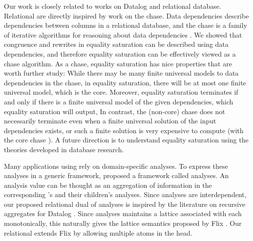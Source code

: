 Our work is closely related to works on Datalog and relational database.
Relational \egraphs are directly inspired by work on the chase.
Data dependencies describe dependencies between columns in a relational database, 
 and the chase is a family of iterative algorithms
 for reasoning about data dependencies \citep{chase-revisited, bench-chase}.
We showed that congruence and rewrites in equality saturation 
 can be described using data dependencies, 
 and therefore equality saturation can be effectively viewed as a chase algorithm.
As a chase, equality saturation has nice properties that are worth further study:
While there may be many finite universal models to data dependencies in the chase,
 in equality saturation,
 there will be at most one finite universal model, 
 which is the core.
Moreover,
 equality saturation terminates 
 if and only if there is a finite universal model of the given dependencies, 
 which equality saturation will output,
In contrast,
 the (non-core) chase does not necessarily terminate 
 even when a finite universal solution of the input dependencies exists,
 or such a finite solution is very expensive to compute (with the core chase \citep{chase-revisited}).
A future direction is 
 to understand equality saturation using the theories developed 
 in database research.

Many applications using \egraphs rely on domain-specific analyses.
To express these analyses in a generic \egraph framework, 
 \egg proposed a framework called \eclass analyses.
An \eclass analysis value can be thought as an aggregation of 
 information in the corresponding \eclass's \enodes and their children's \eclass analyses.
Since \eclass analyses are interdependent,
 our proposed relational dual of \eclass analyses 
 is inspired by the literature on recursive aggregates for Datalog 
 \citep{mono-agg,bloom-lattice,datalogo,prov-semiring,flix}.
Since \eclass analyses maintains a lattice associated with each \eclass monotonically,
 this naturally gives the lattice semantics proposed by Flix \citep{flix}.
Our relational \egraphs extends Flix by allowing multiple atoms in the head. 






